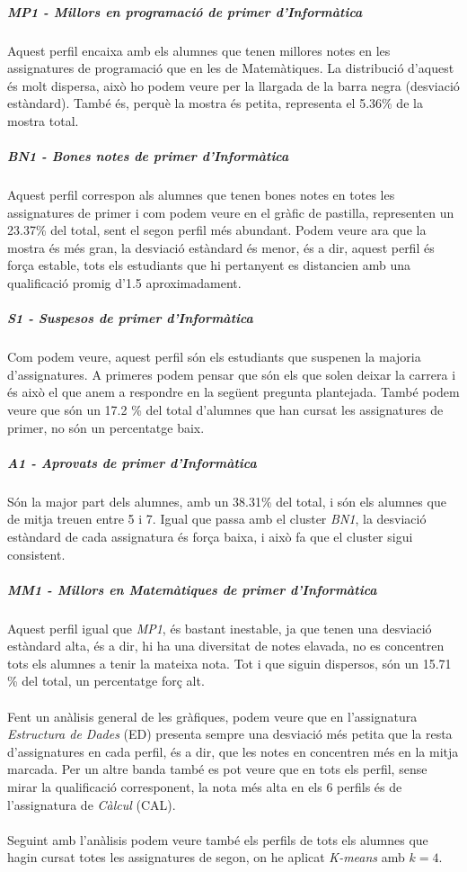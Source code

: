 \documentclass[12pt,a4paper,catalan]{article}
\begin{document}
\subparagraph{MP1 - Millors en programació de primer d'Informàtica} 
Aquest perfil encaixa amb els alumnes que tenen millores notes en les assignatures de programació que en les de Matemàtiques. La distribució d'aquest és molt dispersa, això ho podem veure per la llargada de la barra negra (desviació estàndard). També és, perquè la mostra és petita, representa el 5.36\% de la mostra total.

\subparagraph{BN1 - Bones notes de primer d'Informàtica}
Aquest perfil correspon als alumnes que tenen bones notes en totes les assignatures de primer i com podem veure en el gràfic de pastilla, representen un 23.37\% del total, sent el segon perfil més abundant. Podem veure ara que la mostra és més gran, la desviació estàndard és menor, és a dir, aquest perfil és força estable, tots els estudiants que hi pertanyent es distancien amb una qualificació promig d'1.5 aproximadament.

\subparagraph{S1 - Suspesos de primer d'Informàtica}
Com podem veure, aquest perfil són els estudiants que suspenen la majoria d'assignatures. A primeres podem pensar que són els que solen deixar la carrera i és això el que anem a respondre en la següent pregunta plantejada. També podem veure que són un 17.2 \% del total d'alumnes que han cursat les assignatures de primer, no són un percentatge baix.

\subparagraph{A1 - Aprovats de primer d'Informàtica}
Són la major part dels alumnes, amb un 38.31\% del total, i són els alumnes que de mitja treuen entre 5 i 7. Igual que passa amb el cluster \textit{BN1}, la desviació estàndard de cada assignatura és força baixa, i això fa que el cluster sigui consistent.

\subparagraph{MM1 - Millors en Matemàtiques de primer d'Informàtica}
Aquest perfil igual que \textit{MP1}, és bastant inestable, ja que tenen una desviació estàndard alta, és a dir, hi ha una diversitat de notes elavada, no es concentren tots els alumnes a tenir la mateixa nota. Tot i que siguin dispersos, són un 15.71 \% del total, un percentatge forç alt.
\\
\\
Fent un anàlisis general de les gràfiques, podem veure que en l'assignatura \textit{Estructura de Dades} (ED) presenta sempre una desviació més petita que la resta d'assignatures en cada perfil, és a dir, que les notes en concentren més en la mitja marcada. Per un altre banda també es pot veure que en tots els perfil, sense mirar la qualificació corresponent, la nota més alta en els 6 perfils és de l'assignatura de \textit{Càlcul} (CAL).
\\
\\
Seguint amb l'anàlisis podem veure també els perfils de tots els alumnes que hagin cursat totes les assignatures de segon, on he aplicat \textit{K-means} amb $k=4$.
\end{document}
